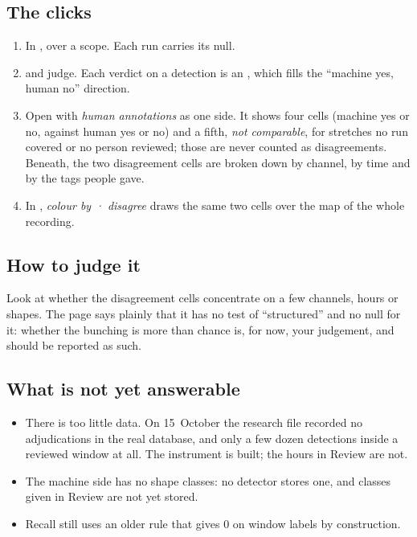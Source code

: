\subsection*{The clicks}
\begin{enumerate}
\item In ,  over a scope. Each run carries its
  null.
\item {} and judge. Each verdict on a detection is an
  , which fills the ``machine yes, human no'' direction.
\item Open  with \emph{human annotations} as one side. It shows
  four cells (machine yes or no, against human yes or no) and a fifth, \emph{not comparable},
  for stretches no run covered or no person reviewed; those are never counted as
  disagreements. Beneath, the two disagreement cells are broken down by channel, by time and
  by the tags people gave.
\item In , \emph{colour by · disagree} draws the same two cells over
  the map of the whole recording.
\end{enumerate}

\subsection*{How to judge it}
Look at whether the disagreement cells concentrate on a few channels, hours or shapes. The
page says plainly that it has no test of ``structured'' and no null for it: whether the
bunching is more than chance is, for now, your judgement, and should be reported as such.

\subsection*{What is not yet answerable}
\begin{itemize}
\item There is too little data. On 15~October the research file recorded no adjudications in
  the real database, and only a few dozen detections inside a reviewed window at all. The
  instrument is built; the hours in Review are not.
\item The machine side has no shape classes: no detector stores one, and classes given in
  Review are not yet stored.
\item Recall still uses an older rule that gives 0 on window labels by construction.
\end{itemize}

